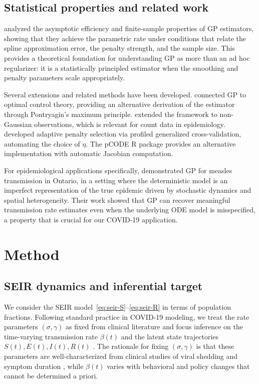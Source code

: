 \documentclass[11pt]{article}
\begin{document}
\subsection{Statistical properties and related work}

\citet{QiZhao2010} analyzed the asymptotic efficiency and finite-sample properties of GP estimators, showing that they achieve the parametric rate under conditions that relate the spline approximation error, the penalty strength, and the sample size. This provides a theoretical foundation for understanding GP as more than an ad hoc regularizer: it is a statistically principled estimator when the smoothing and penalty parameters scale appropriately.

Several extensions and related methods have been developed. \citet{Brunel2015} connected GP to optimal control theory, providing an alternative derivation of the estimator through Pontryagin's maximum principle. \citet{Nanshan2022} extended the framework to non-Gaussian observations, which is relevant for count data in epidemiology. \citet{CaoRamsay2009} developed adaptive penalty selection via profiled generalized cross-validation, automating the choice of $\eta$. The pCODE R package \citep{WangCao2023} provides an alternative implementation with automatic Jacobian computation.

For epidemiological applications specifically, \citet{Hooker2011} demonstrated GP for measles transmission in Ontario, in a setting where the deterministic model is an imperfect representation of the true epidemic driven by stochastic dynamics and spatial heterogeneity. Their work showed that GP can recover meaningful transmission rate estimates even when the underlying ODE model is misspecified, a property that is crucial for our COVID-19 application.


\section{Method}\label{sec:method}

\subsection{SEIR dynamics and inferential target}\label{sec:seir}

We consider the SEIR model~\eqref{eq:seir-S}--\eqref{eq:seir-R} in terms of population fractions. Following standard practice in COVID-19 modeling, we treat the rate parameters $(\sigma, \gamma)$ as fixed from clinical literature and focus inference on the time-varying transmission rate $\beta(t)$ and the latent state trajectories $S(t), E(t), I(t), R(t)$ \citep{Keeling2008,Hethcote2000}. The rationale for fixing $(\sigma, \gamma)$ is that these parameters are well-characterized from clinical studies of viral shedding and symptom duration \citep{He2020,Byrne2020}, while $\beta(t)$ varies with behavioral and policy changes that cannot be determined a priori.
\end{document}
